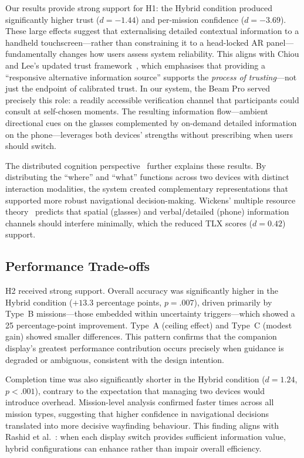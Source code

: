 \documentclass[review]{vgtc}           %
\begin{document}
Our results provide strong support for H1: the Hybrid condition
produced significantly higher trust ($d = -1.44$) and per-mission
confidence ($d = -3.69$). These large effects suggest that externalising detailed
contextual information to a handheld touchscreen---rather than
constraining it to a head-locked AR panel---fundamentally changes how
users assess system reliability. This aligns with Chiou and Lee's
updated trust framework~\cite{Chiou:2023:TAD}, which emphasises that
providing a ``responsive alternative information source'' supports the
\emph{process of trusting}---not just the endpoint of calibrated
trust. In our system, the Beam Pro served precisely this role:
a readily accessible verification channel that participants could
consult at self-chosen moments. The resulting information flow---ambient
directional cues on the glasses complemented by on-demand detailed
information on the phone---leverages both devices' strengths without
prescribing when users should switch.

The distributed cognition perspective~\cite{Hutchins:1995:CIW,
Hollan:2000:DCT} further explains these results. By distributing the
``where'' and ``what'' functions across two devices with distinct
interaction modalities, the system created complementary
representations that supported more robust navigational
decision-making. Wickens' multiple resource
theory~\cite{Wickens:2002:MRP} predicts that spatial (glasses) and
verbal/detailed (phone) information channels should interfere
minimally, which the reduced TLX scores ($d = 0.42$) support.

\subsection{Performance Trade-offs}

H2 received strong support. Overall accuracy was significantly higher
in the Hybrid condition ($+13.3$ percentage points, $p = .007$),
driven primarily by Type~B missions---those embedded within uncertainty
triggers---which showed a 25 percentage-point improvement. Type~A
(ceiling effect) and Type~C (modest gain) showed smaller differences.
This pattern confirms that the companion display's greatest
performance contribution occurs precisely when guidance is degraded or
ambiguous, consistent with the design intention.

Completion time was also significantly shorter in the Hybrid condition
($d = 1.24$, $p < .001$), contrary to the expectation that managing
two devices would introduce overhead. Mission-level analysis confirmed
faster times across all mission types, suggesting that higher
confidence in navigational decisions translated into more decisive
wayfinding behaviour. This finding aligns with Rashid et
al.~\cite{Rashid:2012:CDS}: when each display switch provides
sufficient information value, hybrid configurations can enhance rather
than impair overall efficiency.
\end{document}
